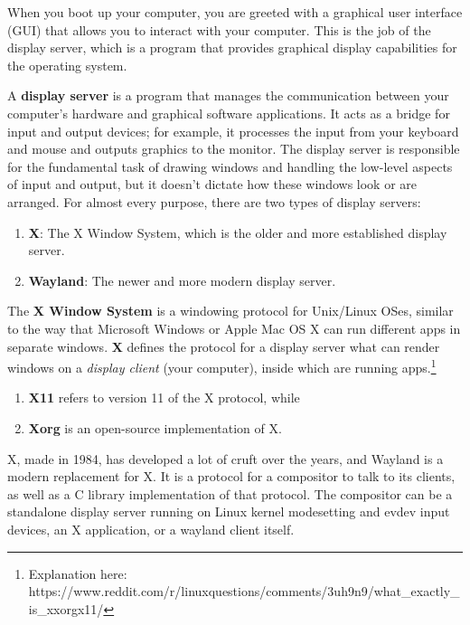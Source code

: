 \documentclass{article}
\begin{document}
  When you boot up your computer, you are greeted with a graphical user interface (GUI) that allows you to interact with your computer. This is the job of the display server, which is a program that provides graphical display capabilities for the operating system. 

  \begin{definition}
    A \textbf{display server} is a program that manages the communication between your computer's hardware and graphical software applications. It acts as a bridge for input and output devices; for example, it processes the input from your keyboard and mouse and outputs graphics to the monitor. The display server is responsible for the fundamental task of drawing windows and handling the low-level aspects of input and output, but it doesn't dictate how these windows look or are arranged. For almost every purpose, there are two types of display servers: 
    \begin{enumerate} 
      \item \textbf{X}: The X Window System, which is the older and more established display server. 
      \item \textbf{Wayland}: The newer and more modern display server.
    \end{enumerate}
  \end{definition}

  \begin{definition}
    The \textbf{X Window System} is a windowing protocol for Unix/Linux OSes, similar to the way that Microsoft Windows or Apple Mac OS X can run different apps in separate windows. \textbf{X} defines the protocol for a display server what can render windows on a \textit{display client} (your computer), inside which are running apps.\footnote{Explanation here: https://www.reddit.com/r/linuxquestions/comments/3uh9n9/what\_exactly\_is\_xxorgx11/} 
    \begin{enumerate} 
      \item \textbf{X11} refers to version 11 of the X protocol, while 
      \item \textbf{Xorg} is an open-source implementation of X. 
    \end{enumerate}
  \end{definition}

  \begin{definition}[Wayland]
    X, made in 1984, has developed a lot of cruft over the years, and Wayland is a modern replacement for X. It is a protocol for a compositor to talk to its clients, as well as a C library implementation of that protocol. The compositor can be a standalone display server running on Linux kernel modesetting and evdev input devices, an X application, or a wayland client itself. 
  \end{definition}
\end{document}
